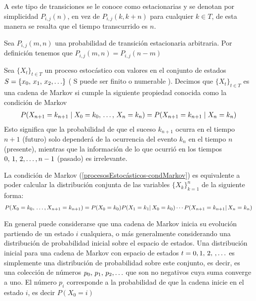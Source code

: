 A este tipo de transiciones se le conoce como estacionarias y se denotan por simplicidad $P_{i,j}(n)$, en vez de $P_{i,j}(k,k+n)$ para cualquier $k\in T$, de esta manera se resalta que el tiempo transcurrido es $n$.\\
\begin{Obs}
    Sea $P_{i,j}(m,n)$ una probabilidad de transición estacionaria arbitraria. Por definición tenemos que $P_{i,j}(m,n)=P_{i,j}(n-m)$
\end{Obs}
\begin{Def}
    Sea  $\{X_t\}_{t\in T}$ un proceso estocástico con valores en el conjunto de estados $S=\{x_0,\thinspace x_1,\thinspace x_2 ,\ldots\}$ ( S puede ser finito o numerable ).
    Decimos que $\{X_t\}_{t\in T}$ es una cadena de Markov si cumple la siguiente propiedad conocida como la condición de Markov
    \begin{eqnarray}
    P(X_{n+1}=k_{n+1}\mid  X_{0}=k_0,\thinspace\ldots,\thinspace X_{n}=k_n)=P(X_{n+1}=k_{n+1}\mid X_{n}=k_n)
    \label{procesosEstocásticos-condMarkov}
    \end{eqnarray}
    Esto significa que la probabilidad de que el suceso $k_{n+1}$ ocurra en el tiempo $n+1$ (futuro) solo dependerá de la ocurrencia del evento $k_n$ en el tiempo $n$ (presente), mientras que la información de lo que ocurrió en los tiempos $0,\thinspace 1,\thinspace 2, \ldots,n-1$ (pasado) es irrelevante.
\end{Def}
\begin{Teo}
    La condición de Markov (\ref{procesosEstocásticos-condMarkov}) es equivalente a poder calcular la distribución conjunta de las variables $\{X_k\}_{k=1}^n$ de la siguiente forma:
    \begin{eqnarray}
    \label{procesosEstocásticos-condMarkovEquiv}
    P(X_0= k_0,\thinspace\ldots,X_{n+1}= k_{n+1}) =P(X_0=k_0)P(X_1=k_1|\thinspace X_0=k_0)\cdots P(X_{n+1}=k_{n+1}|\thinspace X_n=k_n)
    \end{eqnarray}
\end{Teo}
En general puede considerarse que una cadena de Markov inicia su evolución
partiendo de un estado $i$ cualquiera, o más generalmente considerando una
distribución de probabilidad inicial sobre el espacio de estados. Una distribución inicial para una cadena de Markov con espacio de estados $t= 0, 1,\thinspace 2,\thinspace,\ldots  $ es simplemente una distribución de probabilidad sobre este conjunto, es decir,
es una colección de números $p_0,\thinspace p_1,\thinspace p_2 ,\ldots$ que son no negativos cuya suma converge a uno. El número $p_i$ corresponde a la probabilidad de que la cadena inicie en el estado $i$, es decir $P(X_0= i)$\\ \\
